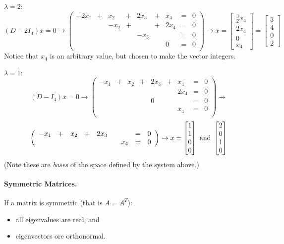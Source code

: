 $\lambda=2$:
\[(D-2I_4)x = 0 \rightarrow \left(\begin{array}{rcrcrcrcr} -2x_1 & + & x_2 & + & 2x_3 & + & x_4 & = & 0\\ &&-x_2 & + &  & + & 2x_4 & = & 0\\ &&&  & -x_3 &&&  = & 0\\ &&& &&& 0& = & 0\\\end{array}\right)\rightarrow x = \begin{bmatrix}\frac{3}{2}x_4\\2x_4\\0\\x_4\end{bmatrix}=\begin{bmatrix}3\\4\\0\\2\end{bmatrix}\]
Notice that $x_4$ is an arbitrary value, but chosen to make the vector integers.  

$\lambda=1$:
\[(D-I_4)x = 0 \rightarrow \left(\begin{array}{rcrcrcrcr} -x_1 & + & x_2 & + & 2x_3 & + & x_4 & = & 0\\ && & &  &  & 2x_4 & = & 0\\ &&&  & 0 &&&  = & 0\\ &&& &&& x_4 & = & 0\\\end{array}\right)\rightarrow\]
\[\left(\begin{array}{rcrcrcrcr}-x_1 & + & x_2 & + & 2x_3 &  &  & = & 0\\ &&& &&& x_4 & = & 0\\\end{array}\right) \rightarrow x = \begin{bmatrix}1\\1\\0\\0\end{bmatrix} \textnormal{ and }\begin{bmatrix}2\\0\\1\\0\end{bmatrix}\]
(Note these are \textit{bases} of the space defined by the system above.)



\paragraph{Symmetric Matrices.}
If a matrix is symmetric (that is $A=A^T$): 
\begin{itemize}
\item all eigenvalues are real, and 
\item eigenvectors ore orthonormal. 
\end{itemize}


